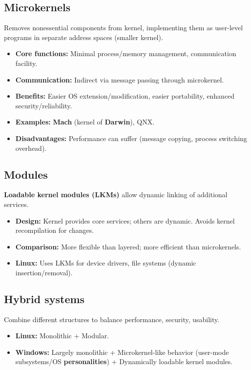 \subsection*{Microkernels}
Removes nonessential components from kernel, implementing them as user-level programs in separate address spaces (smaller kernel).
\begin{itemize}
    \item \textbf{Core functions:} Minimal process/memory management, communication facility.
    \item \textbf{Communication:} Indirect via message passing through microkernel.
    \item \textbf{Benefits:} Easier OS extension/modification, easier portability, enhanced security/reliability.
    \item \textbf{Examples:} \textbf{Mach} (kernel of \textbf{Darwin}), QNX.
    \item \textbf{Disadvantages:} Performance can suffer (message copying, process switching overhead).
\end{itemize}

\subsection*{Modules}
\textbf{Loadable kernel modules (LKMs)} allow dynamic linking of additional services.
\begin{itemize}
    \item \textbf{Design:} Kernel provides core services; others are dynamic. Avoids kernel recompilation for changes.
    \item \textbf{Comparison:} More flexible than layered; more efficient than microkernels.
    \item \textbf{Linux:} Uses LKMs for device drivers, file systems (dynamic insertion/removal).
\end{itemize}

\subsection*{Hybrid systems}
Combine different structures to balance performance, security, usability.
\begin{itemize}
    \item \textbf{Linux:} Monolithic + Modular.
    \item \textbf{Windows:} Largely monolithic + Microkernel-like behavior (user-mode subsystems/OS \textbf{personalities}) + Dynamically loadable kernel modules.
\end{itemize}

